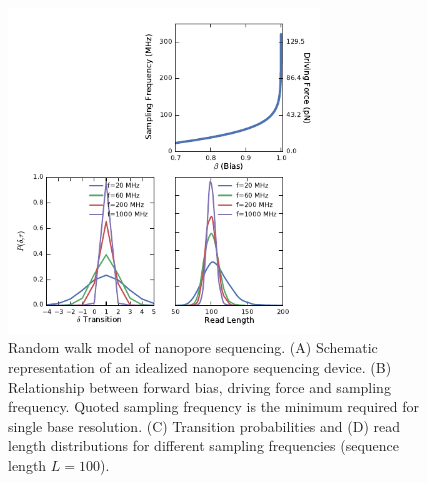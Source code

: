 \documentclass{biophys_letter}
\begin{document}
\begin{figure}
  \centering
  \includegraphics[width=3.25in]{fig/fig1_new.pdf}
  \caption{Random walk model of nanopore sequencing. (A) Schematic representation of an idealized nanopore sequencing device. (B) Relationship between forward bias, driving force and sampling frequency. Quoted sampling frequency is the minimum required for single base resolution. (C) Transition probabilities and (D) read length distributions for different sampling frequencies (sequence length $L=100$).}
  \label{fig:fig1}
\end{figure}
\end{document}
